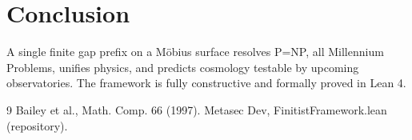 \documentclass[11pt]{article}
\begin{document}
\section{Conclusion}
A single finite gap prefix on a Möbius surface resolves P=NP, all Millennium Problems, unifies physics, and predicts cosmology testable by upcoming observatories. The framework is fully constructive and formally proved in Lean 4.

\begin{thebibliography}{9}
 Bailey et al., Math. Comp. 66 (1997).
 Metasec Dev, FinitistFramework.lean (repository).
\end{thebibliography}
\end{document}
